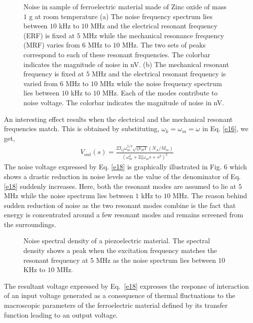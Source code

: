 \documentclass[12pt,column,showpacs,pre,preprintnumbers,amsmath,amssymb,aps,standalone]{revtex4-2}
\begin{document}
\begin{figure}[htbp]
	  
	\label{Fig. 5}
	\caption{\small Noise in sample of ferroelectric material made of Zinc oxide of mass $ 1 $ g at room temperature (a) The noise frequency spectrum lies between $ 10 $ kHz to $ 10 $ MHz and the electrical resonant frequency (ERF) is fixed at $5$ MHz while the mechanical resonance frequency (MRF) varies from $6$ MHz to $10$ MHz. The two sets of peaks correspond to each of these resonant frequencies. The colorbar indicates the magnitude of noise in nV. (b) The mechanical resonant frequency is fixed at $5$ MHz and the electrical resonant frequency is varied from  $6$ MHz to $10$ MHz while the noise frequency spectrum lies between $ 10 $ kHz to $ 10 $ MHz. Each of the modes contribute to noise voltage. The colorbar indicates the magnitude of noise in nV.
	}
\end{figure}
An interesting effect results when the electrical and the mechanical resonant frequencies match. This is obtained by substituting, $\omega_k=\omega_m=\omega$ in Eq. \ref{e16}, we get,
\begin{align} \label{e18}
V_{out}(s)=\frac{2\Im_{ij}\omega_m^{5/2}\sqrt{\zeta k_BT}(N_A/M_m)}{(\omega_m^2+2\zeta \omega_m s+s^2)^2}
\end{align}
The noise voltage expressed by Eq. \ref{e18} is graphically illustrated in Fig. 6 which shows a drastic reduction in noise levels as the value of the denominator of Eq. \ref{e18} suddenly increases. Here, both the resonant modes are assumed to lie at $ 5 $ MHz while the noise spectrum lies between $ 1 $ kHz to $ 10  $ MHz. The reason behind sudden reduction of noise as the two resonant modes combine is the fact that energy is concentrated around a few resonant modes and remains screened from the surroundings. 
\begin{figure}[htbp]
	\label{Fig.6}
	\caption{\small Noise spectral density of a piezoelectric material. The spectral density shows a peak when the excitation frequency matches the resonant frequency at $ 5 $ MHz as the noise spectrum lies between $ 10 $ KHz to $ 10 $ MHz. 
	}
\end{figure}
The resultant voltage expressed by Eq.~\ref{e18} expresses the response of interaction of an input voltage generated as a consequence of thermal fluctuations to the macroscopic parameters of the ferroelectric material defined by its transfer function leading to an output voltage.  
\end{document}
